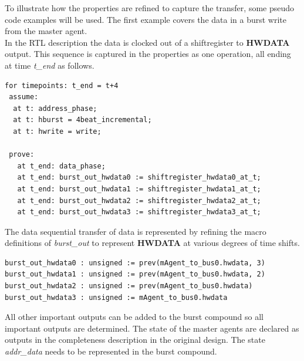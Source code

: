 To illustrate how the properties are refined to capture the transfer, some pseudo code examples will be used. The first example covers the data in a burst write from the master agent. \\
In the RTL description the data is clocked out of a shiftregister to \textbf{HWDATA} output. This sequence is captured in the properties as one operation, all ending at time \textit{t\_end} as follows.
\begin{lstlisting}
for timepoints: t_end = t+4
 assume:
  at t: address_phase;
  at t: hburst = 4beat_incremental; 
  at t: hwrite = write;

 prove:
   at t_end: data_phase;
   at t_end: burst_out_hwdata0 := shiftregister_hwdata0_at_t; 
   at t_end: burst_out_hwdata1 := shiftregister_hwdata1_at_t; 
   at t_end: burst_out_hwdata2 := shiftregister_hwdata2_at_t;
   at t_end: burst_out_hwdata3 := shiftregister_hwdata3_at_t;
\end{lstlisting}

The data sequential transfer of data is represented by refining the macro definitions of \textit{burst\_out} to represent \textbf{HWDATA} at various degrees
of time shifts. 
 
\begin{lstlisting}
burst_out_hwdata0 : unsigned := prev(mAgent_to_bus0.hwdata, 3) 
burst_out_hwdata1 : unsigned := prev(mAgent_to_bus0.hwdata, 2) 
burst_out_hwdata2 : unsigned := prev(mAgent_to_bus0.hwdata)
burst_out_hwdata3 : unsigned := mAgent_to_bus0.hwdata 
\end{lstlisting}

All other important outputs can be added to the burst compound so all important outputs are determined. The state of the master agents are declared as outputs
in the completeness description in the original design. The state \textit{addr\_data} needs to be represented in the burst compound. 


